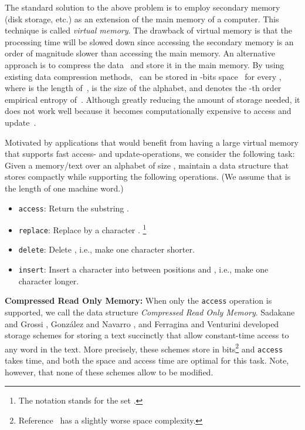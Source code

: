 \documentclass{llncs}
\begin{document}
The standard solution to the above problem is to employ secondary memory
(disk storage, etc.) as an extension of the main memory of a computer.
This technique is called \emph{virtual memory}.
The drawback of virtual memory is that the processing time will be slowed
down since accessing the secondary memory is an order of magnitude slower
than accessing the main memory.
An alternative approach is to compress the data~ and store it in the main
memory.
By using existing data compression methods, ~can be stored in
-bits space~\cite{FerMan05,GGV03}
for every ,
where  is the length of~,  is the size of the alphabet,
and  denotes the -th order empirical entropy of~.
Although greatly reducing the amount of storage needed, it does not work well
because it becomes computationally expensive to access and update~.

Motivated by applications that would benefit from having a large virtual
memory that supports fast access- and update-operations, we consider
the following task:
Given a memory/text  over an alphabet of size , maintain
a data structure that stores  compactly while supporting the following
operations.
(We assume that  is the length of one machine
word.)
\begin{itemize}
\vspace*{-1mm}
\item[{\raise0.3pt\hbox{}}]
  \textnormal{\texttt{access}}:
  Return the substring .
\item[{\raise0.3pt\hbox{}}]
  \textnormal{\texttt{replace}}:
  Replace  by a character .
  \footnote{The notation  stands for the
  set .}
\item[{\raise0.3pt\hbox{}}]
  \textnormal{\texttt{delete}}:
  Delete ,
  i.e., make  one character shorter.
\item[{\raise0.3pt\hbox{}}]
  \textnormal{\texttt{insert}}:
  Insert a character  into  between
positions  and ,
  i.e., make  one character longer.
\end{itemize}

\noindent
\textbf{Compressed Read Only Memory:}
When only the \texttt{access} operation is supported,
we call the data structure \emph{Compressed Read Only Memory}.
Sadakane and Grossi \cite{SG_SODA2006},
Gonz\'alez and Navarro \cite{GonzalezN06}, and
Ferragina and Venturini \cite{FerVen07b}
developed storage schemes for storing a text succinctly that
allow constant-time access to any word in the text.
More precisely, these schemes store  in
 bits\footnote{Reference~\cite{SG_SODA2006} has
a slightly worse space complexity.}
and \texttt{access} takes  time,
and both the space and access time are optimal for this task.
Note, however, that none of these schemes allow  to be modified.
\end{document}
